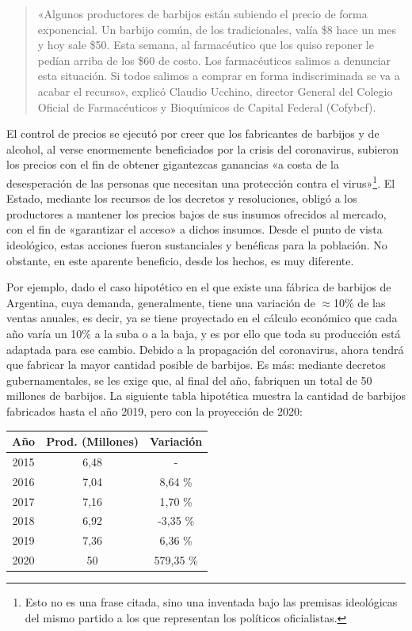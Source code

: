 \documentclass[12pt,a4paper,twoside]{book}
\begin{document}
\begin{quotation}
«Algunos productores de barbijos están subiendo el precio de forma exponencial. Un barbijo común, de los tradicionales, valía \$8 hace un mes y hoy sale \$50. Esta semana, al farmacéutico que los quiso reponer le pedían arriba de los \$60 de costo. Los farmacéuticos salimos a denunciar esta situación. Si todos salimos a comprar en forma indiscriminada se va a acabar el recurso», explicó Claudio Ucchino, director General del Colegio Oficial de Farmacéuticos y Bioquímicos de Capital Federal (Cofybcf). \cite{infobae:control-insumos}
\end{quotation}

El control de precios se ejecutó por creer que los fabricantes de barbijos y de alcohol, al verse enormemente beneficiados por la crisis del coronavirus, subieron los precios con el fin de obtener gigantezcas ganancias «a costa de la desesperación de las personas que necesitan una protección contra el virus»\footnote{Esto no es una frase citada, sino una inventada bajo las premisas ideológicas del mismo partido a los que representan los políticos oficialistas.}. El Estado, mediante los recursos de los decretos y resoluciones, obligó a los productores a mantener los precios bajos de sus insumos ofrecidos al mercado, con el fin de «garantizar el acceso» a dichos insumos. Desde el punto de vista ideológico, estas acciones fueron sustanciales y benéficas para la población. No obstante, en este aparente beneficio, desde los hechos, es muy diferente.

Por ejemplo, dado el caso hipotético en el que existe una fábrica de barbijos de Argentina, cuya demanda, generalmente, tiene una variación de $ \approx $10\% de las ventas anuales, es decir, ya se tiene proyectado en el cálculo económico que cada año varía un 10\% a la suba o a la baja, y es por ello que toda su producción está adaptada para ese cambio. Debido a la propagación del coronavirus, ahora tendrá que fabricar la mayor cantidad posible de barbijos. Es más: mediante decretos gubernamentales, se les exige que, al final del año, fabriquen un total de 50 millones de barbijos. La siguiente tabla hipotética muestra la cantidad de barbijos fabricados hasta el año 2019, pero con la proyección de 2020:

\begin{center}
\begin{tabular}{|c|c|c|}
\hline
\textbf{Año} & \textbf{Prod. (Millones)} & \textbf{Variación} \\
\hline
2015 & 6,48 & - \\
\hline
2016 & 7,04 & 8,64 \% \\
\hline
2017 & 7,16 & 1,70 \% \\
\hline
2018 & 6,92 & -3,35 \% \\
\hline
2019 & 7,36 & 6,36 \% \\
\hline
2020 & 50 & 579,35 \% \\
\hline
\end{tabular} 
\end{center}
\end{document}
